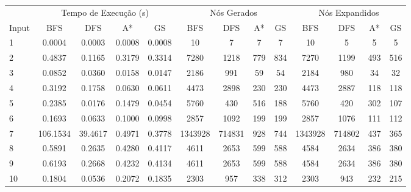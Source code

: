 \documentclass[12pt]{exam}
\renewcommand\_{\textunderscore\linebreak[1]}
\begin{document}
        \begin{adjustbox}{width={\textwidth}, totalheight={\textheight}, keepaspectratio}
        \begin{tabular}{l cccc cccc cccc}
        \toprule
         & \multicolumn{4}{c}{Tempo de Execução (s)} & \multicolumn{4}{c}{Nós Gerados} & \multicolumn{4}{c}{Nós Expandidos}\\
        \cmidrule(lr){2-5} \cmidrule(lr){6-9} \cmidrule(lr){10-13}
        Input           & BFS  & DFS  & A* & GS       & BFS  & DFS  & A* & GS        & BFS  & DFS  & A* & GS \\
        \midrule
        1               & 0.0004 & 0.0003  & 0.0008    & 0.0008            & 10    & 7 & 7    & 7       & 10   & 5   & 5      &5  \\
        2               & 0.4837 & 0.1165  & 0.3179    & 0.3314            & 7280  & 1218 & 779  & 834       & 7270   & 1199   & 493    &516  \\
        3               & 0.0852 & 0.0360  & 0.0158    & 0.0147            & 2186  & 991 & 59   & 54       & 2184   & 980   & 34     &32  \\
        4               & 0.3192 & 0.1758  & 0.0630    & 0.0611            & 4473  & 2898 & 230  & 230       & 4473   & 2887   & 118    &118  \\
        5               & 0.2385 & 0.0176  & 0.1479    & 0.0454            & 5760  & 430 & 516  & 188       & 5760   & 420   & 302    &107  \\
        6               & 0.1693 & 0.0633  & 0.1000    & 0.0998            & 2857  & 1092 & 199  & 199       & 2857   & 1076   & 111    &112  \\
        7             & 106.1534 & 39.4617  & 0.4971    & 0.3778         & 1343928  & 714831 & 928  & 744       & 1343928   & 714802   & 437    &365  \\
        8               & 0.5891 & 0.2635  & 0.4280    & 0.4117            & 4611  & 2653 & 599  & 588       & 4584   & 2634   & 386    &380  \\
        9               & 0.6193 & 0.2668  & 0.4232    & 0.4134            & 4611  & 2653 & 599  & 588       & 4584   & 2634   & 386    &380  \\
        10              & 0.1804 & 0.0536  & 0.2072    & 0.1835            & 2303  & 957 & 338  & 312       & 2303   & 943   & 232    &215  \\
        \bottomrule
        \end{tabular}
        \end{adjustbox} \\
        
\end{document}
